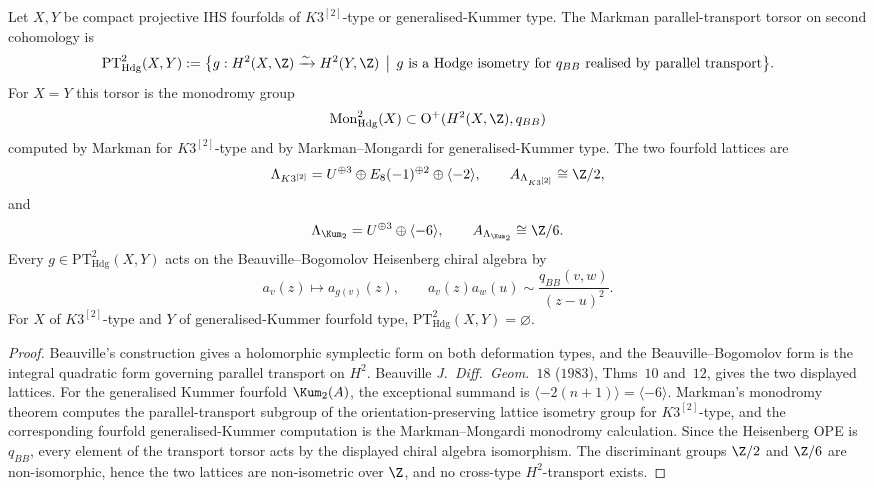 \begin{theorem}
\label{thm:rw4-markman-monodromy-morphism}
Let $X,Y$ be compact projective IHS fourfolds of \(K3^{[2]}\)-type or
generalised-Kummer type. The Markman parallel-transport torsor on
second cohomology is
\[
 \mathrm{PT}^2_{\mathrm{Hdg}}(X,Y)
 :=
 \bigl\{
 g:H^2(X,\Z)\xrightarrow{\sim}H^2(Y,\Z)
 \,\bigm|\,
 g \text{ is a Hodge isometry for } q_{BB}
 \text{ realised by parallel transport}
 \bigr\}.
\]
For \(X=Y\) this torsor is the monodromy group
\[
 \mathrm{Mon}^2_{\mathrm{Hdg}}(X)
 \subset
 \mathrm{O}^+(H^2(X,\Z),q_{BB})
\]
computed by Markman for \(K3^{[2]}\)-type and by Markman--Mongardi for
generalised-Kummer type. The two fourfold lattices are
\[
 \Lambda_{K3^{[2]}}
 =
 U^{\oplus3}\oplus E_8(-1)^{\oplus2}\oplus\langle-2\rangle,
 \qquad
 A_{\Lambda_{K3^{[2]}}}\cong \Z/2,
\]
and
\[
 \Lambda_{\Kum_2}
 =
 U^{\oplus3}\oplus\langle-6\rangle,
 \qquad
 A_{\Lambda_{\Kum_2}}\cong \Z/6.
\]
Every \(g\in\mathrm{PT}^2_{\mathrm{Hdg}}(X,Y)\) acts on the
Beauville--Bogomolov Heisenberg chiral algebra by
\[
 a_v(z)\longmapsto a_{g(v)}(z),
 \qquad
 a_v(z)a_w(u)\sim \frac{q_{BB}(v,w)}{(z-u)^2}.
\]
For \(X\) of \(K3^{[2]}\)-type and \(Y\) of generalised-Kummer
fourfold type, \(\mathrm{PT}^2_{\mathrm{Hdg}}(X,Y)=\varnothing\).
\end{theorem}

\begin{proof}
Beauville's construction gives a holomorphic symplectic form on both
deformation types, and the Beauville--Bogomolov form is the integral
quadratic form governing parallel transport on \(H^2\). Beauville
\emph{J.\ Diff.\ Geom.}~$18$ \textup{(}$1983$\textup{)}, Thms~$10$
and~$12$, gives the two displayed lattices. For the generalised Kummer
fourfold \(\Kum_2(A)\), the exceptional summand is
\(\langle-2(n+1)\rangle=\langle-6\rangle\).
Markman's monodromy theorem computes the parallel-transport subgroup
of the orientation-preserving lattice isometry group for
\(K3^{[2]}\)-type, and the corresponding fourfold generalised-Kummer
computation is the Markman--Mongardi monodromy calculation. Since the
Heisenberg OPE is \(q_{BB}\), every element of the transport torsor
acts by the displayed chiral algebra isomorphism.
The discriminant groups \(\Z/2\) and \(\Z/6\) are non-isomorphic, hence
the two lattices are non-isometric over \(\Z\), and no cross-type
\(H^2\)-transport exists.
\end{proof}

